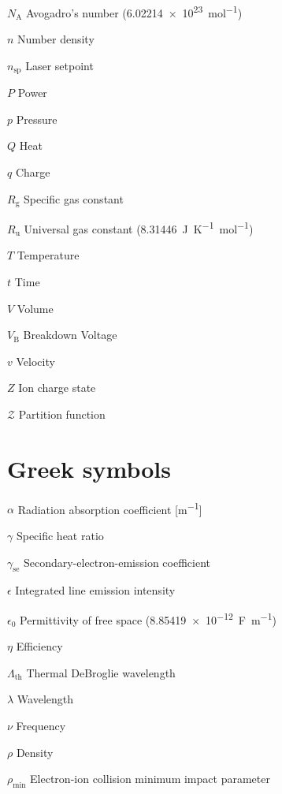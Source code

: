 \begin{multicols}{2}
\begin{nomlist}
        \item[$N_\mathrm{A}$]   Avogadro's number (\qty{6.02214e+23}{mol^{-1}})
        \item[$n$]              Number density 
        \item[$n_\mathrm{sp}$]  Laser setpoint 
        \item[$P$]              Power 
        \item[$p$]              Pressure
        \item[$Q$]              Heat
        \item[$q$]              Charge
        \item[$R_\mathrm{g}$]   Specific gas constant
        \item[$R_\mathrm{u}$]   Universal gas constant (\qty{8.31446}{J.K^{-1}.mol^{-1}})
        \item[$T$]              Temperature
        \item[$t$]              Time
        \item[$V$]              Volume
        \item[$V_\mathrm{B}$]   Breakdown Voltage
        \item[$v$]              Velocity
        \item[$Z$]              Ion charge state
        \item[$\mathcal{Z}$]    Partition function
    \end{nomlist}

    \section*{Greek symbols}
    \begin{nomlist}
        \item[$\alpha$]         Radiation absorption coefficient [\unit{m^{-1}}]
        \item[$\gamma$]         Specific heat ratio
        \item[$\gamma_\mathrm{se}$]         Secondary-electron-emission coefficient
        \item[$\epsilon$]       Integrated line emission intensity 
        \item[$\epsilon_0$]     Permittivity of free space (\qty{8.85419e-12}{F.m^{-1}})
        \item[$\eta$]           Efficiency 
        \item[$\Lambda_\mathrm{th}$]        Thermal DeBroglie wavelength
        \item[$\lambda$]        Wavelength
        \item[$\nu$]            Frequency
        \item[$\rho$]           Density
        \item[$\rho_\mathrm{min}$]  Electron-ion collision minimum impact parameter
    \end{nomlist}


\end{multicols}

